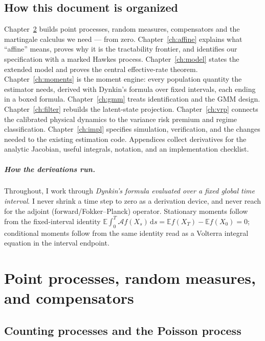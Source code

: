 \documentclass[11pt]{report}
\theoremstyle{definition}
\theoremstyle{remark}
\newcommand{\E}{\mathbb{E}}
\newcommand{\A}{\mathcal{A}}
\newcommand{\dd}{\,\mathrm{d}}
\begin{document}
\section{How this document is organized}

Chapter~\ref{ch:pp} builds point processes, random measures, compensators and
the martingale calculus we need --- from zero. Chapter~\ref{ch:affine}
explains what ``affine'' means, proves why it is the tractability frontier,
and identifies our specification with a marked Hawkes process.
Chapter~\ref{ch:model} states the extended model and proves the central
effective-rate theorem. Chapter~\ref{ch:moments} is the moment engine: every
population quantity the estimator needs, derived with Dynkin's formula over
fixed intervals, each ending in a boxed formula. Chapter~\ref{ch:gmm} treats
identification and the GMM design. Chapter~\ref{ch:filter} rebuilds the
latent-state projection. Chapter~\ref{ch:vrp} connects the calibrated
physical dynamics to the variance risk premium and regime classification.
Chapter~\ref{ch:impl} specifies simulation, verification, and the changes
needed to the existing estimation code. Appendices collect derivatives for the analytic
Jacobian, useful integrals, notation, and an implementation checklist.

\paragraph{How the derivations run.} Throughout, I work through \emph{Dynkin's formula evaluated over a fixed
global time interval}. I never shrink a time step to zero as a derivation device, and never reach
for the adjoint (forward/Fokker--Planck) operator.
Stationary moments follow from the fixed-interval identity
$\E\!\int_{0}^{T}\!\A f(X_{s})\dd s = \E f(X_{T})-\E f(X_{0}) = 0$;
conditional moments follow from the same identity read as a Volterra integral
equation in the interval endpoint.

\chapter{Point processes, random measures, and compensators}
\label{ch:pp}

\section{Counting processes and the Poisson process}
\end{document}
